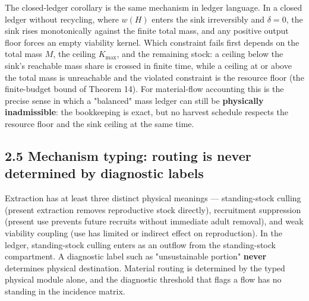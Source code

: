 \documentclass[11pt]{article}
\begin{document}
The closed-ledger corollary is the same mechanism in ledger language. In a closed ledger without recycling, where \(w(H)\) enters the sink irreversibly and \(\delta = 0\), the sink rises monotonically against the finite total mass, and any positive output floor forces an empty viability kernel. Which constraint fails first depends on the total mass \(M\), the ceiling \(K_{\max}\), and the remaining stock: a ceiling below the sink's reachable mass share is crossed in finite time, while a ceiling at or above the total mass is unreachable and the violated constraint is the resource floor (the finite-budget bound of Theorem 14). For material-flow accounting this is the precise sense in which a "balanced" mass ledger can still be \textbf{physically inadmissible}: the bookkeeping is exact, but no harvest schedule respects the resource floor and the sink ceiling at the same time.

\subsection*{2.5 Mechanism typing: routing is never determined by diagnostic labels}\label{25-mechanism-typing-routing-is-never-determined-by-diagnostic-labels}

Extraction has at least three distinct physical meanings --- standing-stock culling (present extraction removes reproductive stock directly), recruitment suppression (present use prevents future recruits without immediate adult removal), and weak viability coupling (use has limited or indirect effect on reproduction). In the ledger, standing-stock culling enters as an outflow from the standing-stock compartment. A diagnostic label such as "unsustainable portion" \textbf{never} determines physical destination. Material routing is determined by the typed physical module alone, and the diagnostic threshold that flags a flow has no standing in the incidence matrix.
\end{document}
